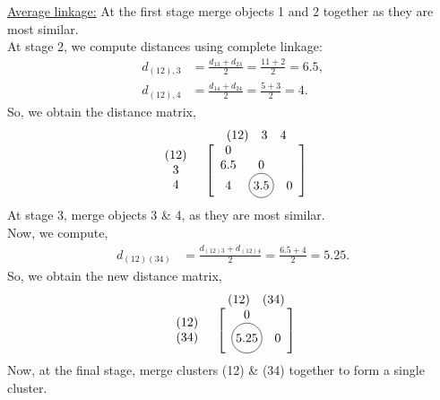 \documentclass[addpoints,answers,a4paper,11pt]{exam}
\newcommand*\circled[1]{\tikz[baseline=(char.base)]{
    \node[shape=circle, draw, inner sep=2pt] (char) {#1};}}
\begin{document}
\begin{questions}
\begin{parts}
\begin{solution}
         \underline{Average linkage:}
         At the first stage merge objects 1 and 2 together as they are most similar. \\
         At stage 2, we compute distances using complete linkage:
         \begin{align*}
            d_{(12),3} &= \frac{d_{13} + d_{23}}{2} = \frac{11 + 2}{2} = 6.5,\\
            d_{(12),4} &= \frac{d_{14} + d_{24}}{2} = \frac{5 + 3}{2} = 4.
         \end{align*}
         So, we obtain the distance matrix,
         \[
            \begin{array}{cc}
               & \begin{array}{ccc} (12) & 3 & 4 \end{array} \\
               \begin{array}{c} (12) \\ 3 \\ 4 \end{array} &
               \left[ \begin{array}{ccc}
                     0 & & \\
                     6.5 & 0 & \\
                     4 & \circled{3.5} & 0
               \end{array} \right]
            \end{array}
         \]
         At stage 3, merge objects 3 \& 4, as they are most similar. \\
         Now, we compute,
         \begin{align*}
            d_{(12)(34)} &= \frac{d_{(12)3} + d_{(12)4}}{2} = \frac{6.5 + 4}{2}
            = 5.25.
         \end{align*}
         So, we obtain the new distance matrix,
         \[
            \begin{array}{cc}
               & \begin{array}{cc} (12) & (34) \end{array} \\
               \begin{array}{c} (12) \\ (34) \end{array} &
               \left[ \begin{array}{cc}
                     0 & \\
                     \circled{5.25} & 0
               \end{array} \right]
            \end{array}
         \]
         Now, at the final stage, merge clusters (12) \& (34) together to form a
         single cluster.
      \end{solution}


\end{parts}
\end{questions}
\end{document}
